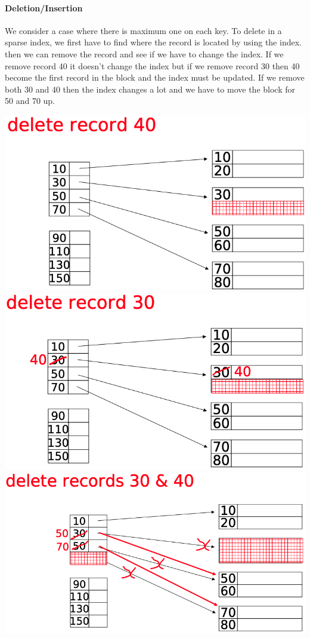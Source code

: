 \documentclass[12pt,a4paper]{article}
\begin{document}
\paragraph{Deletion/Insertion}
We consider a case where there is maximum one on each key.
To delete in a sparse index, we first have to find where the record is located by using the index. then we can remove the record and see if we have to change the index. If we remove record 40 it doesn't change the index but if we remove record 30 then 40 become the first record in the block and the index must be updated. If we remove both 30 and 40 then the index changes a lot and we have to move the block for 50 and 70 up. 
\begin{center}
\includegraphics[scale=0.2]{img/img28.png}
\includegraphics[scale=0.2]{img/img29.png}
\includegraphics[scale=0.2]{img/img30.png}
\end{center}
\end{document}
